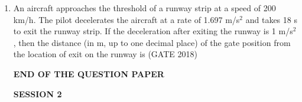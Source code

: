 \documentclass[journal,12pt,onecolumn]{IEEEtran}
\theoremstyle{remark}
\begin{document}
\begin{enumerate}
\item An aircraft approaches the threshold of a runway strip at a speed of 200 km/h. The pilot decelerates the aircraft at a rate of 1.697 m/s$^2$ and takes 18 s to exit the runway strip. If the deceleration after exiting the runway is 1 m/s$^2$, then the distance (in m, up to one decimal place) of the gate position from the location of exit on the runway is \underline{\hspace{3cm}}
\hfill{(GATE 2018)}
\vspace{1cm}
\vspace{4cm}
\begin{center}
    \textbf{\Large END OF THE QUESTION PAPER}
\end{center}
\newpage
\begin{center}
    

\vspace{15cm}
\textbf{\LARGE SESSION 2}
\end{center}
\newpage

    
   




    
\end{enumerate}
\end{document}
